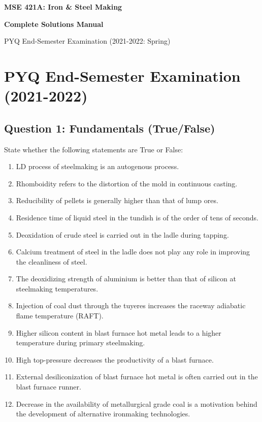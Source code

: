 \documentclass[11pt,a4paper]{article}
\begin{document}
\begin{center}
    {\Huge\bfseries\textcolor{primary}{MSE 421A: Iron \& Steel Making}\par}
    \vspace{0.5cm}
    {\Large\bfseries Complete Solutions Manual\par}
    \vspace{0.5cm}
    {\large PYQ End-Semester Examination (2021-2022: Spring)\par}
    \vspace{1cm}
\end{center}

\section{PYQ End-Semester Examination (2021-2022)}

\subsection{Question 1: Fundamentals (True/False)}
\begin{questionbox}
State whether the following statements are True or False:
\begin{enumerate}
    \item[(a)] LD process of steelmaking is an autogenous process.
    \item[(b)] Rhomboidity refers to the distortion of the mold in continuous casting.
    \item[(c)] Reducibility of pellets is generally higher than that of lump ores.
    \item[(d)] Residence time of liquid steel in the tundish is of the order of tens of seconds.
    \item[(e)] Deoxidation of crude steel is carried out in the ladle during tapping.
    \item[(f)] Calcium treatment of steel in the ladle does not play any role in improving the cleanliness of steel.
    \item[(g)] The deoxidizing strength of aluminium is better than that of silicon at steelmaking temperatures.
    \item[(h)] Injection of coal dust through the tuyeres increases the raceway adiabatic flame temperature (RAFT).
    \item[(i)] Higher silicon content in blast furnace hot metal leads to a higher temperature during primary steelmaking.
    \item[(j)] High top-pressure decreases the productivity of a blast furnace.
    \item[(k)] External desiliconization of blast furnace hot metal is often carried out in the blast furnace runner.
    \item[(l)] Decrease in the availability of metallurgical grade coal is a motivation behind the development of alternative ironmaking technologies.
\end{enumerate}
\end{questionbox}
\end{document}
